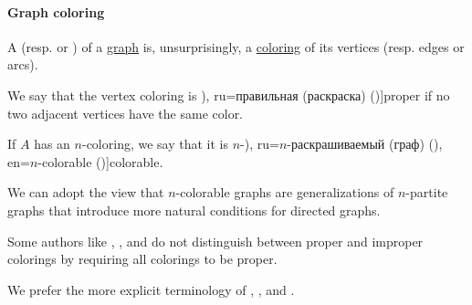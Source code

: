 \paragraph{Graph coloring}

\begin{definition}\label{def:graph_coloring}
  A  (resp.  or ) of a \hyperref[rem:arbitrary_kind_graph]{graph} is, unsurprisingly, a \hyperref[def:set_coloring]{coloring} of its vertices (resp. edges or arcs).

  \begin{thmenum}
     We say that the vertex coloring is \term[bg=правилно (оцветяване) (\cite[141]{Мирчев2001}), ru=правильная (раскраска) (\cite[]{Емеличев1990})]{proper} if no two adjacent vertices have the same color.

     If \( A \) has an \( n \)-coloring, we say that it is \( n \)-\term[bg=\( n \)-оцветим (граф) (\cite[141]{Мирчев2001}), ru=\( n \)-раскрашиваемый (граф) (\cite[]{Емеличев1990}), en=\( n \)-colorable (\cite[111]{Diestel2005})]{colorable}.
  \end{thmenum}
\end{definition}
\begin{comments}
  \item We can adopt the view that \( n \)-colorable graphs are generalizations of \( n \)-partite graphs that introduce more natural conditions for directed graphs.

  \item Some authors like , ,  and  do not distinguish between proper and improper colorings by requiring all colorings to be proper.

  We prefer the more explicit terminology of , ,  and .
\end{comments}


